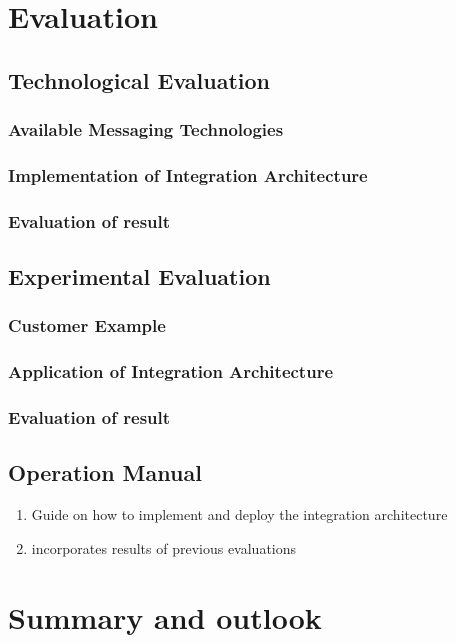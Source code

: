 \documentclass[
     12pt,         %
     a4paper,      %
     BCOR10mm,     %
     DIV14,        %
     ]{scrreprt}
\begin{document}
\chapter{Evaluation}

\section{Technological Evaluation}

\subsection{Available Messaging Technologies}

\subsection{Implementation of Integration Architecture}

\subsection{Evaluation of result}

\section{Experimental Evaluation}

\subsection{Customer Example}

\subsection{Application of Integration Architecture}

\subsection{Evaluation of result}

\section{Operation Manual}
\begin{enumerate}
     \item Guide on how to implement and deploy the integration architecture
     \item incorporates results of previous evaluations
\end{enumerate}

\chapter{Summary and outlook}




\end{document}
